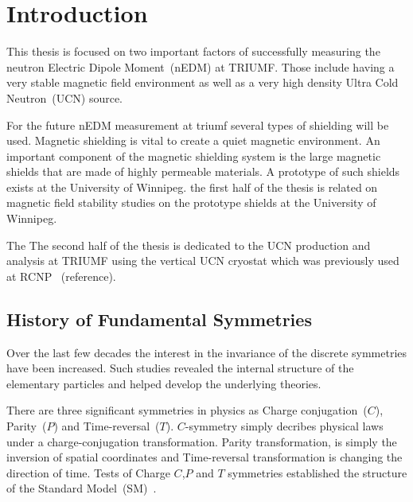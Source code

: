 \chapter{Introduction}
\renewcommand{\thepage}{\arabic{page}}%
\setcounter{page}{1}%



This thesis is focused on two important factors of successfully
measuring the neutron Electric Dipole Moment~(nEDM) at TRIUMF. Those
include having a very stable magnetic field environment as well as a
very high density Ultra Cold Neutron~(UCN) source.

For the future nEDM measurement at triumf several types of shielding
will be used.  Magnetic shielding is vital to create a quiet magnetic
environment. An important component of the magnetic shielding system
is the large magnetic shields that are made of highly permeable
materials. A prototype of such shields exists at the University of
Winnipeg. the first half of the thesis is related on magnetic field
stability studies on the prototype shields at the University of
Winnipeg.

The The second half of the thesis is dedicated to the UCN production
and analysis at TRIUMF using the vertical UCN cryostat which was
previously used at RCNP ~(reference).
 



\section{History of Fundamental Symmetries }

Over the last few decades the interest in the invariance of the
discrete symmetries have been increased. Such studies revealed the
internal structure of the elementary particles and helped develop the
underlying theories.

There are three significant symmetries in physics as Charge
conjugation~($C$), Parity~($P$) and Time-reversal~($T$). $C$-symmetry simply
decribes physical laws under a charge-conjugation
transformation. Parity transformation, is simply the inversion of
spatial coordinates and Time-reversal transformation is changing the
direction of time.
Tests of Charge $C$,$P$ and $T$ symmetries established the structure
of the Standard Model~(SM)~\cite{pospelov2005electric}.  \\

